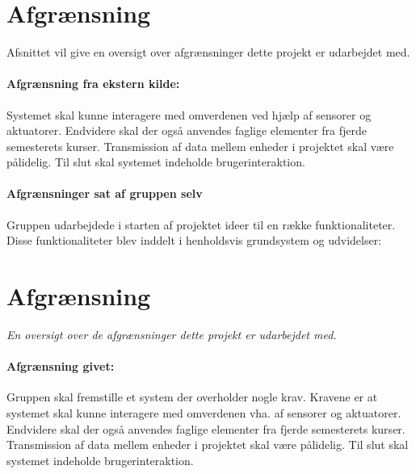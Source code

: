 \chapter{Afgrænsning}
\label{ch:afgraensning}
Afsnittet vil give en oversigt over afgrænsninger dette projekt er udarbejdet med.
\subsubsection{Afgrænsning fra ekstern kilde:}
Systemet skal kunne interagere med omverdenen ved hjælp af sensorer og aktuatorer. Endvidere skal der også anvendes faglige elementer fra fjerde semesterets kurser. Transmission af data mellem enheder i projektet skal være pålidelig. Til slut skal systemet indeholde brugerinteraktion. 
\subsubsection{Afgrænsninger sat af gruppen selv}
Gruppen udarbejdede i starten af projektet ideer til en række funktionaliteter. Disse funktionaliteter blev inddelt i henholdsvis grundsystem og udvidelser:

\chapter{Afgrænsning}
\label{ch:afgraensning}
\textit{En oversigt over de afgrænsninger dette projekt er udarbejdet med.}
\subsubsection{Afgrænsning givet:}
Gruppen skal fremstille et system der overholder nogle krav. Kravene er at systemet skal kunne interagere med omverdenen vha. af sensorer og aktuatorer. Endvidere skal der også anvendes faglige elementer fra fjerde semesterets kurser. Transmission af data mellem enheder i projektet skal være pålidelig. Til slut skal systemet indeholde brugerinteraktion. 

